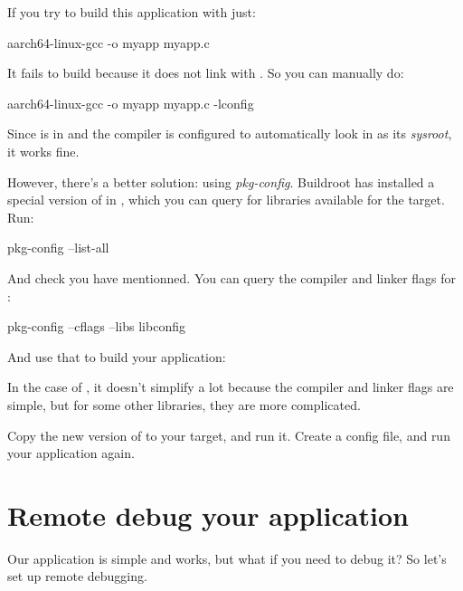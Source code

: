 If you try to build this application with just:

\begin{bashinput}
aarch64-linux-gcc -o myapp myapp.c
\end{bashinput}

It fails to build because it does not link with . So
you can manually do:

\begin{bashinput}
aarch64-linux-gcc -o myapp myapp.c -lconfig
\end{bashinput}

Since  is in  and the
compiler is configured to automatically look in 
as its {\em sysroot}, it works fine.

However, there's a better solution: using {\em pkg-config}. Buildroot
has installed a special version of  in
, which you can query for libraries
available for the target. Run:

\begin{bashinput}
pkg-config --list-all
\end{bashinput}

And check you have  mentionned. You can query the
compiler and linker flags for :

\begin{bashinput}
pkg-config --cflags --libs libconfig
\end{bashinput}

And use that to build your application:


In the case of , it doesn't simplify a lot because the
compiler and linker flags are simple, but for some other libraries,
they are more complicated.

Copy the new version of  to your target, and run
it. Create a  config file, and run your application
again.

\section{Remote debug your application}

Our application is simple and works, but what if you need to debug it?
So let's set up remote debugging.

